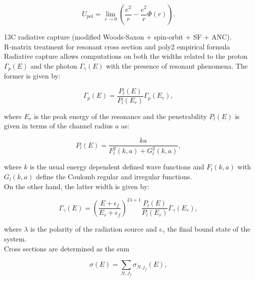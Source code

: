 \documentclass[openany]{book}
\begin{document}
\begin{equation}\label{eq:potential_screening_Upolarizability}
	U_{\mathrm{pol}} = \lim_{r \rightarrow 0 } {\left(\frac{e^2}{r} - \frac{e^2}{r} \Phi(r) \right)}.
\end{equation}


13C radiative capture (modified Woods-Saxon + spin-orbit + SF + ANC). \\

R-matrix treatment for resonant cross section and poly2 empirical formula \cite{kabir_irgaziev_nabi_2020} \\

Radiative capture allows computations on both the widths related to the proton $\Gamma_p(E)$ and the photon $\Gamma_\gamma(E)$ with the presence of resonant phenomena. The former is given by: 

\begin{equation}\label{eq:potential_radiative_width_proton}
	\Gamma_p(E)  = \frac{P_l(E)}{P_l(E_r)}  \Gamma_p(E_r),
\end{equation}

where $E_r$ is the peak energy of the resonance and the penetrability $P_l(E)$ is given in terms of the channel radius $a$ as: 

\begin{equation}\label{eq:potential_radiative_penetrability}
	P_l (E) = \frac{ka}{F^2_l(k, a) + G^2_l(k, a)},
\end{equation}

where $k$ is the usual energy dependent defined wave functions and $F_l(k, a)$ with $G_l(k, a)$ define the Coulomb regular and irregular functions.  \\

On the other hand, the latter width is given by:

\begin{equation}\label{eq:potential_radiative_width_photon}
	\Gamma_\gamma(E)  =  \left(\frac{E + \epsilon_f}{E_r + \epsilon_f}\right)^{2\lambda + 1} \frac{P_l(E)}{P_l(E_r)}  \Gamma_\gamma(E_r),
\end{equation}

where $\lambda$ is the polarity of the radiation source and $\epsilon_\gamma$ the final bound state of the system. \\



Cross sections are determined as the sum 


\begin{equation}\label{eq:potential_radiativeCrossSections}
	\sigma(E) = \sum_{N, J_f} \sigma_{N, j_f} (E),
\end{equation}
\end{document}
